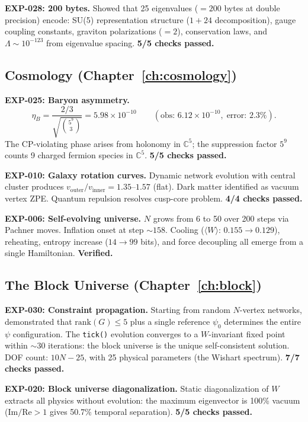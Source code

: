 \documentclass[12pt]{article}
\theoremstyle{remark}
\theoremstyle{definition}
\begin{document}
\textbf{EXP-028: 200 bytes.} Showed that 25 eigenvalues ($= 200$ bytes at double precision) encode: SU(5) representation structure ($1 + 24$ decomposition), gauge coupling constants, graviton polarizations ($= 2$), conservation laws, and $\Lambda \sim 10^{-123}$ from eigenvalue spacing. \textbf{5/5 checks passed.}

\subsection{Cosmology (Chapter~\ref{ch:cosmology})}

\textbf{EXP-025: Baryon asymmetry.}
\begin{equation}
\eta_B = \frac{2/3}{\sqrt{\binom{5^9}{3}}} = 5.98 \times 10^{-10} \qquad (\text{obs: } 6.12 \times 10^{-10},\;\text{error: } 2.3\%).
\end{equation}
The CP-violating phase arises from holonomy in $\mathbb{C}^5$; the suppression factor $5^9$ counts 9 charged fermion species in $\mathbb{C}^5$. \textbf{5/5 checks passed.}

\textbf{EXP-010: Galaxy rotation curves.} Dynamic network evolution with central cluster produces $v_\text{outer}/v_\text{inner} = 1.35$--$1.57$ (flat). Dark matter identified as vacuum vertex ZPE. Quantum repulsion resolves cusp-core problem. \textbf{4/4 checks passed.}

\textbf{EXP-006: Self-evolving universe.} $N$ grows from 6 to 50 over 200 steps via Pachner moves. Inflation onset at step $\sim 158$. Cooling ($\langle W\rangle$: $0.155 \to 0.129$), reheating, entropy increase ($14 \to 99$ bits), and force decoupling all emerge from a single Hamiltonian. \textbf{Verified.}

\subsection{The Block Universe (Chapter~\ref{ch:block})}

\textbf{EXP-030: Constraint propagation.} Starting from random $N$-vertex networks, demonstrated that $\text{rank}(G) \leq 5$ plus a single reference $\psi_0$ determines the entire $\psi$ configuration. The \texttt{tick()} evolution converges to a $W$-invariant fixed point within $\sim 30$ iterations: the block universe is the unique self-consistent solution. DOF count: $10N - 25$, with 25 physical parameters (the Wishart spectrum). \textbf{7/7 checks passed.}

\textbf{EXP-020: Block universe diagonalization.} Static diagonalization of $W$ extracts all physics without evolution: the maximum eigenvector is 100\% vacuum ($\text{Im}/\text{Re} > 1$ gives 50.7\% temporal separation). \textbf{5/5 checks passed.}
\end{document}
